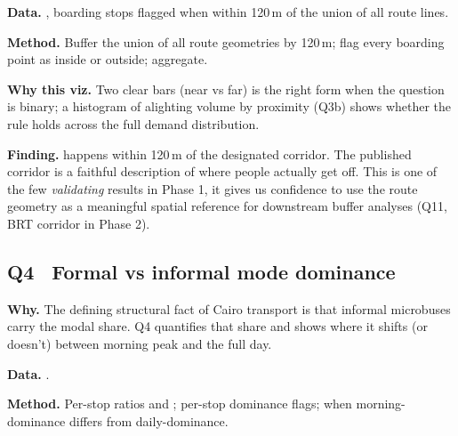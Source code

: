 \textbf{Data.} , boarding stops flagged
 when within 120\,m of the union of all route lines.

\textbf{Method.} Buffer the union of all route geometries by 120\,m;
flag every boarding point as inside or outside; aggregate.


\textbf{Why this viz.} Two clear bars (near vs far) is the right form
when the question is binary; a histogram of alighting volume by
proximity (Q3b) shows whether the rule holds across the full demand
distribution.

\textbf{Finding.}  happens within 120\,m of
the designated corridor. The published corridor is a faithful
description of where people actually get off. This is one of the few
\emph{validating} results in Phase 1, it gives us confidence to use
the route geometry as a meaningful spatial reference for downstream
buffer analyses (Q11, BRT corridor in Phase 2).


\subsection{Q4 \textbullet\ Formal vs informal mode dominance}

\textbf{Why.} The defining structural fact of Cairo transport is that
informal microbuses carry the modal share. Q4 quantifies that share
and shows where it shifts (or doesn't) between morning peak and the
full day.

\textbf{Data.} .

\textbf{Method.} Per-stop ratios
 and
; per-stop dominance flags;
 when morning-dominance differs from
daily-dominance.


